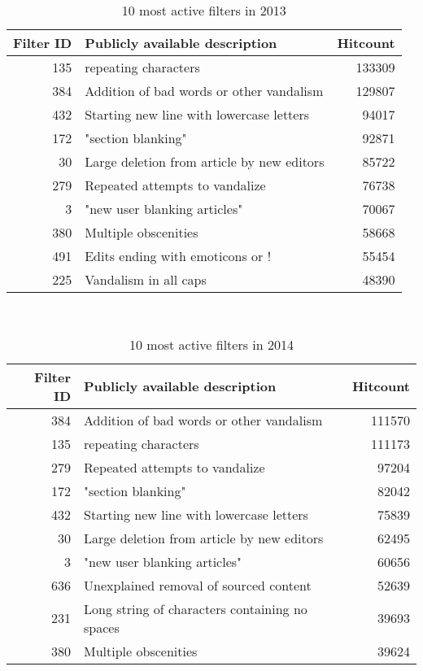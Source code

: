 \begin{table}
  \centering
  \begin{tabular}{r p{9cm} r }
    Filter ID & Publicly available description & Hitcount \\
    \hline
    135 & repeating characters & 133309 \\
    384 & Addition of bad words or other vandalism & 129807 \\
    432 & Starting new line with lowercase letters & 94017 \\
    172 & "section blanking" & 92871 \\
    30 & Large deletion from article by new editors & 85722 \\
    279 & Repeated attempts to vandalize & 76738 \\
    3 & "new user blanking articles" & 70067 \\
    380 & Multiple obscenities & 58668 \\
    491 & Edits ending with emoticons or ! & 55454 \\
    225 & Vandalism in all caps & 48390 \\
  \end{tabular}
  \caption{10 most active filters in 2013}~\label{tab:app-most-active-2013}
\end{table}

\begin{table}
  \centering
  \begin{tabular}{r p{9cm} r }
    Filter ID & Publicly available description & Hitcount \\
    \hline
    384 & Addition of bad words or other vandalism & 111570 \\
    135 & repeating characters & 111173 \\
    279 & Repeated attempts to vandalize & 97204 \\
    172 & "section blanking" & 82042 \\
    432 & Starting new line with lowercase letters & 75839 \\
    30  & Large deletion from article by new editors & 62495 \\
    3 & "new user blanking articles" & 60656 \\
    636 & Unexplained removal of sourced content & 52639 \\
    231 & Long string of characters containing no spaces & 39693 \\
    380 & Multiple obscenities & 39624 \\
  \end{tabular}
  \caption{10 most active filters in 2014}~\label{tab:app-most-active-2014}
\end{table}

